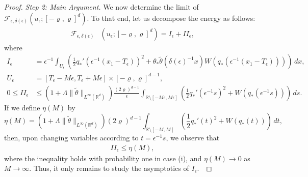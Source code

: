 \documentclass[12pt]{amsart}
\begin{document}
\begin{proof}
	\textit{Step 2: Main Argument.} We now determine the limit of $\mathscr{F}_{\epsilon,\delta(\epsilon)}(u_{\epsilon} ; [-\varrho,\varrho]^{d})$.  To that end, let us decompose the energy as follows:
		\begin{align*}
			\mathscr{F}_{\epsilon,\delta(\epsilon)} &(u_{\epsilon}; [-\varrho,\varrho]^{d}) = I_{\epsilon} + II_{\epsilon}, 
		\end{align*}
	where
		\begin{align*}
			I_{\epsilon} &= \epsilon^{-1} \int_{U_{\epsilon}} \left( \frac{1}{2} q_* '(\epsilon^{-1}(x_{1} - T_{\epsilon}))^{2} + \theta_{*} \tilde{\theta}(\delta(\epsilon)^{-1} x) W(q_* (\epsilon^{-1}(x_{1} - T_{\epsilon}))) \right) \, dx, \\
			U_{\epsilon} &= [T_{\epsilon} - M \epsilon, T_{\epsilon} + M \epsilon] \times [- \varrho, \varrho]^{d - 1}, \\
			0 \leq II_{\epsilon} &\leq \left( 1 + \Lambda \|\tilde{\theta}\|_{L^{\infty}(\mathbb{R}^{d})} \right) \frac{ (2\varrho)^{d-1} }{ \epsilon } \int_{\mathbb{R} \setminus [- M \epsilon, M \epsilon]} \left( \frac{1}{2} q_{*} '( \epsilon^{-1} s )^{2} +W(q_{*} ( \epsilon^{-1} s )) \right) \,ds.
		\end{align*}
	If we define $\eta(M)$ by 
		\begin{equation*}
			\eta(M)  = \left( 1 + \Lambda \|\tilde{\theta}\|_{L^{\infty}(\mathbb{R}^{d})} \right) (2 \varrho)^{d-1} \int_{\mathbb{R} \setminus [-M,M]} \left(\frac{1}{2} q_{*} '(t)^{2} + W(q_{*} (t)) \right) \, dt,
		\end{equation*}
	then, upon changing variables according to $t = \epsilon^{-1} s$, we observe that 
		\begin{align*}
			II_{\epsilon} \leq \eta(M),
		\end{align*}
	where the inequality holds with probability one in case (i), and $\eta(M) \to 0$ as $M \to \infty$.  Thus, it only remains to study the asymptotics of $I_{\epsilon}$.\
	

\end{proof}
\end{document}
